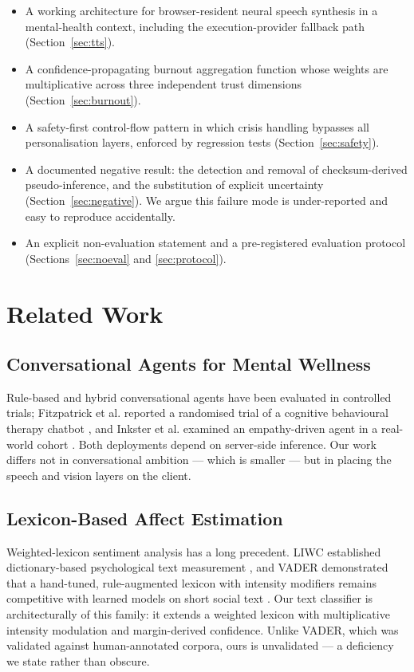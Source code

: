 \documentclass[runningheads]{llncs}
\begin{document}
\begin{itemize}
\item A working architecture for browser-resident neural speech synthesis in a
mental-health context, including the execution-provider fallback path
(Section~\ref{sec:tts}).
\item A confidence-propagating burnout aggregation function whose weights are
multiplicative across three independent trust dimensions
(Section~\ref{sec:burnout}).
\item A safety-first control-flow pattern in which crisis handling bypasses all
personalisation layers, enforced by regression tests
(Section~\ref{sec:safety}).
\item A documented negative result: the detection and removal of
checksum-derived pseudo-inference, and the substitution of explicit
uncertainty (Section~\ref{sec:negative}). We argue this failure mode is
under-reported and easy to reproduce accidentally.
\item An explicit non-evaluation statement and a pre-registered evaluation
protocol (Sections~\ref{sec:noeval} and \ref{sec:protocol}).
\end{itemize}

\section{Related Work}

\subsection{Conversational Agents for Mental Wellness}
Rule-based and hybrid conversational agents have been evaluated in controlled
trials; Fitzpatrick et al. reported a randomised trial of a cognitive
behavioural therapy chatbot \cite{woebot}, and Inkster et al. examined an
empathy-driven agent in a real-world cohort \cite{wysa}. Both deployments
depend on server-side inference. Our work differs not in conversational
ambition --- which is smaller --- but in placing the speech and vision layers
on the client.

\subsection{Lexicon-Based Affect Estimation}
Weighted-lexicon sentiment analysis has a long precedent. LIWC established
dictionary-based psychological text measurement \cite{liwc}, and VADER
demonstrated that a hand-tuned, rule-augmented lexicon with intensity
modifiers remains competitive with learned models on short social text
\cite{vader}. Our text classifier is architecturally of this family: it extends
a weighted lexicon with multiplicative intensity modulation and margin-derived
confidence. Unlike VADER, which was validated against human-annotated
corpora, ours is unvalidated --- a deficiency we state rather than obscure.
\end{document}
